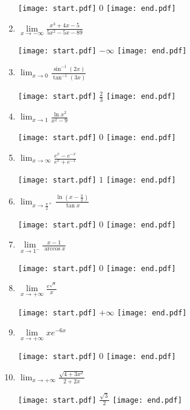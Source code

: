 \documentclass[12pt]{article}
\begin{document}
\begin{enumerate}
\texttt{[image: start.pdf]}
{{$0$}}
\texttt{[image: end.pdf]}


\item $\lim\limits_{x\rightarrow -\infty} \frac{x^3+4x-5}{5x^2-5x-89}$  

\texttt{[image: start.pdf]}
{{$-\infty$}}
\texttt{[image: end.pdf]}


\item $\lim_{x \rightarrow 0}{\frac{\sin^{-1}{(2x)}}{\tan^{-1}{(3x)}}}$

\texttt{[image: start.pdf]}
{{$\frac{2}{3}$}}
\texttt{[image: end.pdf]}


\item $\lim_{x \rightarrow 1}{\frac{\ln{x^2}}{x^2-9}}$

\texttt{[image: start.pdf]}
{{$0$}}
\texttt{[image: end.pdf]}


\item $\lim_{x \rightarrow \infty}{\frac{e^x-e^{-x}}{e^x+e^{-x}}}$

\texttt{[image: start.pdf]}
{{$1$}}
\texttt{[image: end.pdf]}


\item $\lim_{x \rightarrow \frac{\pi}{2}^{+}}{\frac{\ln{\left(x-\frac{\pi}{2}\right)}}{\tan{x}}}$

\texttt{[image: start.pdf]}
{{$0$}}
\texttt{[image: end.pdf]}


\item $\lim\limits_{x\rightarrow 1^-} \frac{x-1}{\arccos{x}}$ 

\texttt{[image: start.pdf]}
{{0}}
\texttt{[image: end.pdf]}


\item $\lim\limits_{x\rightarrow +\infty}\frac{e^{\sqrt{x}}}{x}$ 

\texttt{[image: start.pdf]}
{{$+\infty$}}
\texttt{[image: end.pdf]}


\item $\lim\limits_{x\rightarrow +\infty} xe^{-6x}$ 

\texttt{[image: start.pdf]}
{{0}}
\texttt{[image: end.pdf]}


\item $\lim_{x \rightarrow +\infty}{\frac{\sqrt{4+3x^2}}{2+2x}}$

\texttt{[image: start.pdf]}
{{$\frac{\sqrt{3}}{2}$}}
\texttt{[image: end.pdf]}



\end{enumerate}
\end{document}
